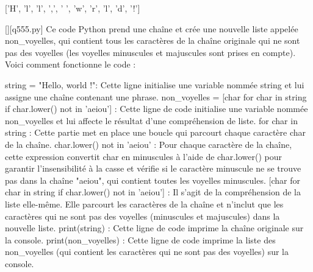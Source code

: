 ['H', 'l', 'l', ',', ' ', 'w', 'r', 'l', 'd', '!']
        \par
        \begin{solution}
            \renewcommand{\nomfichier}{q555.py}
            \pythonfile{\chemincode \nomfichier}[][\nomfichier]
            Ce code Python prend une chaîne et crée une nouvelle liste appelée non\_voyelles, qui contient tous les caractères de la chaîne originale qui ne sont pas des voyelles (les voyelles minuscules et majuscules sont prises en compte). Voici comment fonctionne le code :

    string = "Hello, world !": Cette ligne initialise une variable nommée string et lui assigne une chaîne contenant une phrase.
    non\_voyelles = [char for char in string if char.lower() not in 'aeiou'] : Cette ligne de code initialise une variable nommée non\_voyelles et lui affecte le résultat d'une compréhension de liste.
        for char in string : Cette partie met en place une boucle qui parcourt chaque caractère char de la chaîne.
        char.lower() not in 'aeiou' : Pour chaque caractère de la chaîne, cette expression convertit char en minuscules à l'aide de char.lower() pour garantir l'insensibilité à la casse et vérifie si le caractère minuscule ne se trouve pas dans la chaîne "aeiou", qui contient toutes les voyelles minuscules.
        [char for char in string if char.lower() not in 'aeiou'] : Il s'agit de la compréhension de la liste elle-même. Elle parcourt les caractères de la chaîne et n'inclut que les caractères qui ne sont pas des voyelles (minuscules et majuscules) dans la nouvelle liste.
    print(string) : Cette ligne de code imprime la chaîne originale sur la console.
    print(non\_voyelles) : Cette ligne de code imprime la liste des non\_voyelles (qui contient les caractères qui ne sont pas des voyelles) sur la console.
        \end{solution}
        
